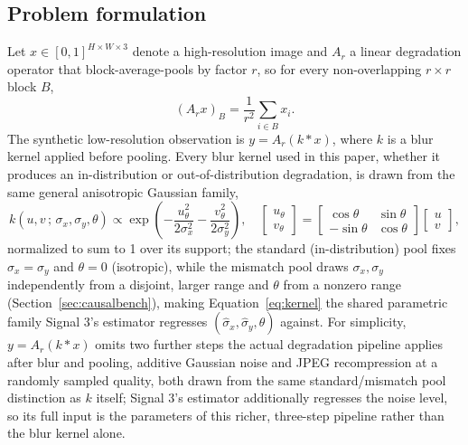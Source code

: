 \documentclass[review]{elsarticle}
\begin{document}
\subsection{Problem formulation}
\label{sec:formulation}

Let $x \in [0,1]^{H \times W \times 3}$ denote a high-resolution image and $A_r$ a linear degradation operator that block-average-pools by factor $r$, so for every non-overlapping $r \times r$ block $B$,
\begin{equation}
(A_r x)_B = \frac{1}{r^2} \sum_{i \in B} x_i.
\label{eq:degradation-op}
\end{equation}
The synthetic low-resolution observation is $y = A_r(k * x)$, where $k$ is a blur kernel applied before pooling. Every blur kernel used in this paper, whether it produces an in-distribution or out-of-distribution degradation, is drawn from the same general anisotropic Gaussian family,
\begin{equation}
k(u, v \,;\, \sigma_x, \sigma_y, \theta) \propto \exp\!\left(-\frac{u_\theta^2}{2\sigma_x^2} - \frac{v_\theta^2}{2\sigma_y^2}\right), \quad \begin{bmatrix} u_\theta \\ v_\theta \end{bmatrix} = \begin{bmatrix} \cos\theta & \sin\theta \\ -\sin\theta & \cos\theta \end{bmatrix}\begin{bmatrix} u \\ v \end{bmatrix},
\label{eq:kernel}
\end{equation}
normalized to sum to 1 over its support; the standard (in-distribution) pool fixes $\sigma_x = \sigma_y$ and $\theta = 0$ (isotropic), while the mismatch pool draws $\sigma_x, \sigma_y$ independently from a disjoint, larger range and $\theta$ from a nonzero range (Section~\ref{sec:causalbench}), making Equation~\ref{eq:kernel} the shared parametric family Signal 3's estimator regresses $(\hat\sigma_x, \hat\sigma_y, \hat\theta)$ against. For simplicity, $y = A_r(k*x)$ omits two further steps the actual degradation pipeline applies after blur and pooling, additive Gaussian noise and JPEG recompression at a randomly sampled quality, both drawn from the same standard/mismatch pool distinction as $k$ itself; Signal 3's estimator additionally regresses the noise level, so its full input is the parameters of this richer, three-step pipeline rather than the blur kernel alone.
\end{document}
